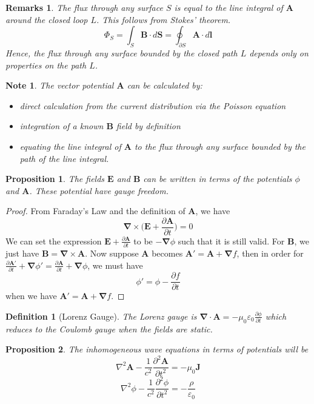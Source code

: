 \documentclass[a4paper]{article}
\newtheorem{remarks}{Remarks}[section]
\newtheorem{Note}{Note}[section]
\theoremstyle{new}
\newtheorem{defi}{Definition}[section]
\newtheorem{prop}{Proposition}[section]
\begin{document}
\begin{remarks}
The flux through any surface $S$ is equal to the line integral of $\mathbf{A}$ around the closed loop $L$. This follows from Stokes' theorem.
$$\Phi_S=\int_S\mathbf{B}\cdot d\mathbf{S}=\oint_{\partial S}\mathbf{A}\cdot d\mathbf{l}$$
Hence, the flux through any surface bounded by the closed path $L$ depends only on properties on the path $L$.
\end{remarks}
\begin{Note}
The vector potential $\mathbf{A}$ can be calculated by:
\begin{itemize}
    \item direct calculation from the current distribution via the Poisson equation
    \item integration of a known $\mathbf{B}$ field by definition
    \item equating the line integral of $\mathbf{A}$ to the flux through any surface bounded by the path of the line integral.
\end{itemize}
\end{Note}
\begin{prop}
The fields $\mathbf{E}$ and $\mathbf{B}$ can be written in terms of the potentials $\phi$ and $\mathbf{A}$. These potential have gauge freedom.
\end{prop}
\begin{proof}
From Faraday's Law and the definition of $\mathbf{A}$, we have
$$\boldsymbol{\nabla}\times\bigg(\mathbf{E}+\frac{\partial\mathbf{A}}{\partial t}\bigg)=0$$
We can set the expression $\mathbf{E}+\frac{\partial\mathbf{A}}{\partial t}$ to be $-\boldsymbol{\nabla}\phi$ such that it is still valid. For $\mathbf{B}$, we just have $\mathbf{B}=\boldsymbol{\nabla}\times\mathbf{A}$. Now suppose $\mathbf{A}$ becomes $\mathbf{A'}=\mathbf{A}+\boldsymbol{\nabla}f$, then in order for $\frac{\partial\mathbf{A'}}{\partial t}+\boldsymbol{\nabla}\phi'=\frac{\partial\mathbf{A}}{\partial t}+\boldsymbol{\nabla}\phi$, we must have
$$\phi'=\phi-\frac{\partial f}{\partial t}$$
when we have $\mathbf{A'}=\mathbf{A}+\boldsymbol{\nabla}f$.
\end{proof}
\begin{defi}[Lorenz Gauge]
The Lorenz gauge is $\boldsymbol{\nabla}\cdot\mathbf{A}=-\mu_0\varepsilon_0\frac{\partial\phi}{\partial t}$ which reduces to the Coulomb gauge when the fields are static.
\end{defi}
\begin{prop}
The inhomogeneous wave equations in terms of potentials will be
$$\nabla^2\mathbf{A}-\frac{1}{c^2}\frac{\partial^2\mathbf{A}}{\partial t^2}=-\mu_0\mathbf{J}$$
$$\nabla^2\phi-\frac{1}{c^2}\frac{\partial^2\phi}{\partial t^2}=-\frac{\rho}{\varepsilon_0}$$
\end{prop}
\end{document}
